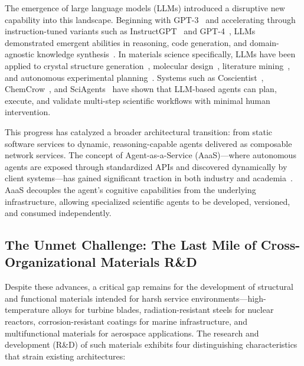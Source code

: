 \documentclass{article}
\begin{document}
The emergence of large language models (LLMs) introduced a disruptive new capability into this landscape. Beginning with GPT-3~\cite{brown2020} and accelerating through instruction-tuned variants such as InstructGPT~\cite{ouyang2022} and GPT-4~\cite{achiam2023}, LLMs demonstrated emergent abilities in reasoning, code generation, and domain-agnostic knowledge synthesis~\cite{wei2022}. In materials science specifically, LLMs have been applied to crystal structure generation~\cite{antunes2024}, molecular design~\cite{sanchez2018}, literature mining~\cite{tshitoyan2019,jiang2025npj}, and autonomous experimental planning~\cite{boiko2023,bran2024}. Systems such as Coscientist~\cite{boiko2023}, ChemCrow~\cite{bran2024}, and SciAgents~\cite{ghafarollahi2024} have shown that LLM-based agents can plan, execute, and validate multi-step scientific workflows with minimal human intervention.

This progress has catalyzed a broader architectural transition: from static software services to dynamic, reasoning-capable agents delivered as composable network services. The concept of Agent-as-a-Service (AaaS)---where autonomous agents are exposed through standardized APIs and discovered dynamically by client systems---has gained significant traction in both industry and academia~\cite{aaasan2025,wu2023autogen}. AaaS decouples the agent's cognitive capabilities from the underlying infrastructure, allowing specialized scientific agents to be developed, versioned, and consumed independently.

\subsection{The Unmet Challenge: The Last Mile of Cross-Organizational Materials R\&D}

Despite these advances, a critical gap remains for the development of structural and functional materials intended for harsh service environments---high-temperature alloys for turbine blades, radiation-resistant steels for nuclear reactors, corrosion-resistant coatings for marine infrastructure, and multifunctional materials for aerospace applications. The research and development (R\&D) of such materials exhibits four distinguishing characteristics that strain existing architectures:
\end{document}
